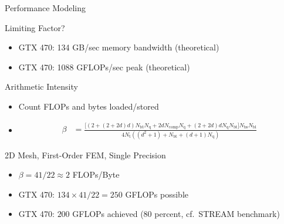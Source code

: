 

\begin{frame}{Performance Modeling}

 \begin{block}{Limiting Factor?}
  \begin{itemize}
   \item GTX 470: 134 GB/sec memory bandwidth (theoretical)
   \item GTX 470: 1088 GFLOPs/sec peak (theoretical)
  \end{itemize}
 \end{block}
 
 \begin{block}{Arithmetic Intensity}
  \begin{itemize}
   \item Count FLOPs and bytes loaded/stored
   \item \vspace*{-0.3cm}\begin{align*}
  \beta &= \frac{\bigl[(2 + (2 + 2d) d) N_{\mathrm{bt}}N_{\mathrm{q}} + 2 d N_{\mathrm{comp}} N_{\mathrm{q}} + (2 + 2d) d N_{\mathrm{q}} N_{\mathrm{bt}} \bigr] N_{\mathrm{bs}} N_{\mathrm{bl}}
                }{4 N_{\mathrm{t}} \left((d^2 + 1) + N_{\mathrm{bt}} + (d + 1) N_{\mathrm{q}} \right)}
         \end{align*}
  \end{itemize}
 \end{block}
 
 \begin{block}{2D Mesh, First-Order FEM, Single Precision}
  \begin{itemize}
   \item $\beta = 41/22 \approx 2$ FLOPs/Byte
   \item GTX 470: $134 \times 41 / 22 = 250$ GFLOPs possible
   \item GTX 470: $200$ GFLOPs achieved (80 percent, cf.~STREAM benchmark)
  \end{itemize}

 \end{block}


\end{frame}
